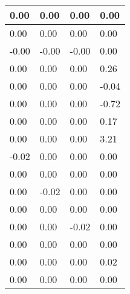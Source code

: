 \begin{tabular}{|l|l|l|l|}
\hline
0.00&0.00&0.00&0.00\\\hline
0.00&0.00&0.00&0.00\\\hline
-0.00&-0.00&-0.00&0.00\\\hline
0.00&0.00&0.00&0.26\\\hline
0.00&0.00&0.00&-0.04\\\hline
0.00&0.00&0.00&-0.72\\\hline
0.00&0.00&0.00&0.17\\\hline
0.00&0.00&0.00&3.21\\\hline
-0.02&0.00&0.00&0.00\\\hline
0.00&0.00&0.00&0.00\\\hline
0.00&-0.02&0.00&0.00\\\hline
0.00&0.00&0.00&0.00\\\hline
0.00&0.00&-0.02&0.00\\\hline
0.00&0.00&0.00&0.00\\\hline
0.00&0.00&0.00&0.02\\\hline
0.00&0.00&0.00&0.00\\\hline
\end{tabular}
